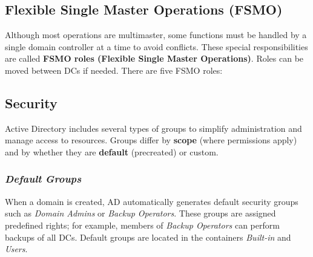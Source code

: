 \subsection{Flexible Single Master Operations (FSMO)}
Although most operations are multimaster, some functions must be handled by a single domain controller at a time to avoid conflicts. These special responsibilities are called \textbf{FSMO roles (Flexible Single Master Operations)}. Roles can be moved between DCs if needed. There are five FSMO roles:


\subsection{Security}
Active Directory includes several types of groups to simplify administration and manage access to resources. Groups differ by \textbf{scope} (where permissions apply) and by whether they are \textbf{default} (precreated) or custom.

\subsubsection{\textit{Default} \textit{Groups}}
When a domain is created, AD automatically generates default security groups such as \textit{Domain Admins} or \textit{Backup Operators}. These groups are assigned predefined rights; for example, members of \textit{Backup Operators} can perform backups of all DCs. Default groups are located in the containers \textit{Built-in} and \textit{Users}.

